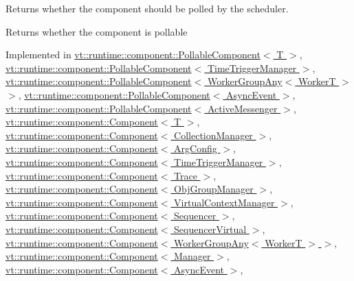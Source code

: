 Returns whether the component should be polled by the scheduler. 

\begin{DoxyReturn}{Returns}
whether the component is pollable 
\end{DoxyReturn}


Implemented in \hyperlink{structvt_1_1runtime_1_1component_1_1_pollable_component_a8ad6cfbc184ed9862cae5304605fe025}{vt\+::runtime\+::component\+::\+Pollable\+Component$<$ T $>$}, \hyperlink{structvt_1_1runtime_1_1component_1_1_pollable_component_a8ad6cfbc184ed9862cae5304605fe025}{vt\+::runtime\+::component\+::\+Pollable\+Component$<$ Time\+Trigger\+Manager $>$}, \hyperlink{structvt_1_1runtime_1_1component_1_1_pollable_component_a8ad6cfbc184ed9862cae5304605fe025}{vt\+::runtime\+::component\+::\+Pollable\+Component$<$ Worker\+Group\+Any$<$ Worker\+T $>$ $>$}, \hyperlink{structvt_1_1runtime_1_1component_1_1_pollable_component_a8ad6cfbc184ed9862cae5304605fe025}{vt\+::runtime\+::component\+::\+Pollable\+Component$<$ Async\+Event $>$}, \hyperlink{structvt_1_1runtime_1_1component_1_1_pollable_component_a8ad6cfbc184ed9862cae5304605fe025}{vt\+::runtime\+::component\+::\+Pollable\+Component$<$ Active\+Messenger $>$}, \hyperlink{structvt_1_1runtime_1_1component_1_1_component_a5a15bd0369a9d3765a6c70249bada96f}{vt\+::runtime\+::component\+::\+Component$<$ T $>$}, \hyperlink{structvt_1_1runtime_1_1component_1_1_component_a5a15bd0369a9d3765a6c70249bada96f}{vt\+::runtime\+::component\+::\+Component$<$ Collection\+Manager $>$}, \hyperlink{structvt_1_1runtime_1_1component_1_1_component_a5a15bd0369a9d3765a6c70249bada96f}{vt\+::runtime\+::component\+::\+Component$<$ Arg\+Config $>$}, \hyperlink{structvt_1_1runtime_1_1component_1_1_component_a5a15bd0369a9d3765a6c70249bada96f}{vt\+::runtime\+::component\+::\+Component$<$ Time\+Trigger\+Manager $>$}, \hyperlink{structvt_1_1runtime_1_1component_1_1_component_a5a15bd0369a9d3765a6c70249bada96f}{vt\+::runtime\+::component\+::\+Component$<$ Trace $>$}, \hyperlink{structvt_1_1runtime_1_1component_1_1_component_a5a15bd0369a9d3765a6c70249bada96f}{vt\+::runtime\+::component\+::\+Component$<$ Obj\+Group\+Manager $>$}, \hyperlink{structvt_1_1runtime_1_1component_1_1_component_a5a15bd0369a9d3765a6c70249bada96f}{vt\+::runtime\+::component\+::\+Component$<$ Virtual\+Context\+Manager $>$}, \hyperlink{structvt_1_1runtime_1_1component_1_1_component_a5a15bd0369a9d3765a6c70249bada96f}{vt\+::runtime\+::component\+::\+Component$<$ Sequencer $>$}, \hyperlink{structvt_1_1runtime_1_1component_1_1_component_a5a15bd0369a9d3765a6c70249bada96f}{vt\+::runtime\+::component\+::\+Component$<$ Sequencer\+Virtual $>$}, \hyperlink{structvt_1_1runtime_1_1component_1_1_component_a5a15bd0369a9d3765a6c70249bada96f}{vt\+::runtime\+::component\+::\+Component$<$ Worker\+Group\+Any$<$ Worker\+T $>$ $>$}, \hyperlink{structvt_1_1runtime_1_1component_1_1_component_a5a15bd0369a9d3765a6c70249bada96f}{vt\+::runtime\+::component\+::\+Component$<$ Manager $>$}, \hyperlink{structvt_1_1runtime_1_1component_1_1_component_a5a15bd0369a9d3765a6c70249bada96f}{vt\+::runtime\+::component\+::\+Component$<$ Async\+Event $>$}, 